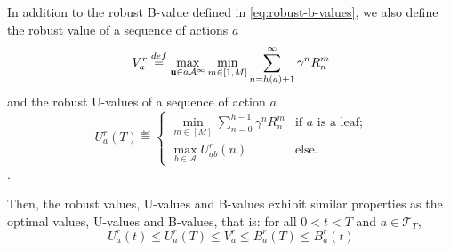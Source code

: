 \documentclass{article}
\begin{document}
\begin{lemma}
	In addition to the robust B-value defined in \eqref{eq:robust-b-values}, we also define the robust value of a sequence of actions $a$
	\begin{equation}
	V_a^r \stackrel{def}{=} \max_{\mathbf{u} \in a\mathcal{A^\infty}} \min_{m\in[1, M]} \sum_{n=h(a)+1}^\infty \gamma^n R^m_n
	\end{equation}
	and the robust U-values of a sequence of action $a$
	\begin{equation}
	U_a^r(T)  \eqdef
	\begin{cases}
	\min_{m\in[M]} \sum_{n=0}^{h-1} \gamma^n R_n^m &\text{if } a \text{ is a leaf;}\\
	\max_{b\in\mathcal{A}} U_{ab}^r(n) & \text{else.}
	\end{cases}
	\end{equation}.
	
	Then, the robust values, U-values and B-values exhibit similar properties as the optimal values, U-values and B-values, that is: for all $0 < t < T$ and $a\in\mathcal{T}_T$,
	\begin{equation}
	U^r_a(t) \leq U^r_a(T) \leq V^r_a \leq B^r_a(T) \leq B^r_a(t)
	\end{equation}
	\label{lemma:uvb}
\end{lemma}
\end{document}
